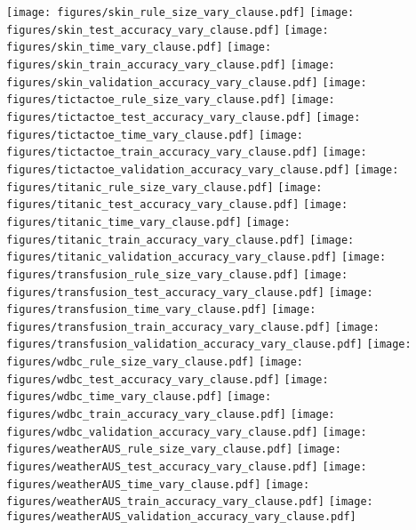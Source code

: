 \begin{figure*}
\texttt{[image: figures/skin\_rule\_size\_vary\_clause.pdf]}
\texttt{[image: figures/skin\_test\_accuracy\_vary\_clause.pdf]}
\texttt{[image: figures/skin\_time\_vary\_clause.pdf]}
\texttt{[image: figures/skin\_train\_accuracy\_vary\_clause.pdf]}
\texttt{[image: figures/skin\_validation\_accuracy\_vary\_clause.pdf]}
\texttt{[image: figures/tictactoe\_rule\_size\_vary\_clause.pdf]}
\texttt{[image: figures/tictactoe\_test\_accuracy\_vary\_clause.pdf]}
\texttt{[image: figures/tictactoe\_time\_vary\_clause.pdf]}
\texttt{[image: figures/tictactoe\_train\_accuracy\_vary\_clause.pdf]}
\texttt{[image: figures/tictactoe\_validation\_accuracy\_vary\_clause.pdf]}
\texttt{[image: figures/titanic\_rule\_size\_vary\_clause.pdf]}
\texttt{[image: figures/titanic\_test\_accuracy\_vary\_clause.pdf]}
\texttt{[image: figures/titanic\_time\_vary\_clause.pdf]}
\texttt{[image: figures/titanic\_train\_accuracy\_vary\_clause.pdf]}
\texttt{[image: figures/titanic\_validation\_accuracy\_vary\_clause.pdf]}
\texttt{[image: figures/transfusion\_rule\_size\_vary\_clause.pdf]}
\texttt{[image: figures/transfusion\_test\_accuracy\_vary\_clause.pdf]}
\texttt{[image: figures/transfusion\_time\_vary\_clause.pdf]}
\texttt{[image: figures/transfusion\_train\_accuracy\_vary\_clause.pdf]}
\texttt{[image: figures/transfusion\_validation\_accuracy\_vary\_clause.pdf]}
\texttt{[image: figures/wdbc\_rule\_size\_vary\_clause.pdf]}
\texttt{[image: figures/wdbc\_test\_accuracy\_vary\_clause.pdf]}
\texttt{[image: figures/wdbc\_time\_vary\_clause.pdf]}
\texttt{[image: figures/wdbc\_train\_accuracy\_vary\_clause.pdf]}
\texttt{[image: figures/wdbc\_validation\_accuracy\_vary\_clause.pdf]}
\texttt{[image: figures/weatherAUS\_rule\_size\_vary\_clause.pdf]}
\texttt{[image: figures/weatherAUS\_test\_accuracy\_vary\_clause.pdf]}
\texttt{[image: figures/weatherAUS\_time\_vary\_clause.pdf]}
\texttt{[image: figures/weatherAUS\_train\_accuracy\_vary\_clause.pdf]}
\texttt{[image: figures/weatherAUS\_validation\_accuracy\_vary\_clause.pdf]}
\end{figure*}









